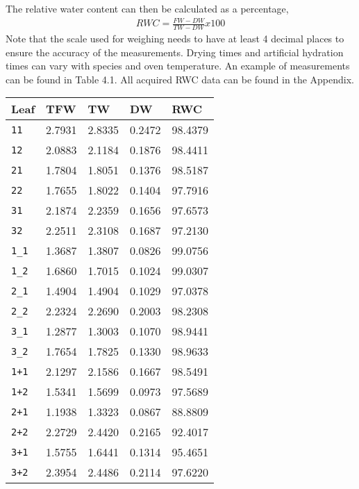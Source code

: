 The relative water content can then be calculated as a percentage,
%
\begin{align}
    RWC = \frac{FW - DW}{TW - DW} x 100%
\end{align}
%
Note that the scale used for weighing needs to have at least 4 decimal places to ensure the accuracy of the measurements. Drying times and artificial hydration times can vary with species and oven temperature. An example of measurements can be found in Table 4.1.  All acquired RWC data can be found in the Appendix.
%
\begin{table}[htb]
  \centering
  \begin{tabular}{lllll}
    \toprule
    \textbf{Leaf} & \textbf{TFW} & \textbf{TW} & \textbf{DW} & \textbf{RWC} \\
    \midrule
      \texttt{11} & 2.7931 & 2.8335 & 0.2472 & 98.4379 \\
      \texttt{12} & 2.0883 & 2.1184 & 0.1876 & 98.4411 \\
      \texttt{21} & 1.7804 & 1.8051 & 0.1376 & 98.5187 \\
      \texttt{22} & 1.7655 & 1.8022 & 0.1404 & 97.7916 \\
      \texttt{31} & 2.1874 & 2.2359 & 0.1656 & 97.6573 \\
      \texttt{32} & 2.2511 & 2.3108 & 0.1687 & 97.2130 \\
      \texttt{1\_1} & 1.3687 & 1.3807 & 0.0826 & 99.0756 \\
      \texttt{1\_2} & 1.6860 & 1.7015 & 0.1024 & 99.0307 \\
      \texttt{2\_1} & 1.4904 & 1.4904 & 0.1029 & 97.0378 \\
      \texttt{2\_2} & 2.2324 & 2.2690 & 0.2003 & 98.2308 \\
      \texttt{3\_1} & 1.2877 & 1.3003 & 0.1070 & 98.9441 \\
      \texttt{3\_2} & 1.7654 & 1.7825 & 0.1330 & 98.9633 \\
      \texttt{1+1} & 2.1297 & 2.1586 & 0.1667 & 98.5491 \\
      \texttt{1+2} & 1.5341 & 1.5699 & 0.0973 & 97.5689 \\
      \texttt{2+1} & 1.1938 & 1.3323 & 0.0867 & 88.8809 \\
      \texttt{2+2} & 2.2729 & 2.4420 & 0.2165 & 92.4017 \\
      \texttt{3+1} & 1.5755 & 1.6441 & 0.1314 & 95.4651 \\
      \texttt{3+2} & 2.3954 & 2.4486 & 0.2114 & 97.6220 \\

\end{tabular}
\end{table}

